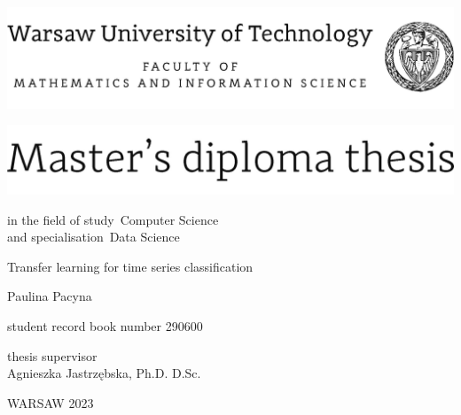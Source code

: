\documentclass[12pt,twoside,a4paper]{article}
\newcommand{\discipline}{Computer Science}
\renewcommand{\title}{Transfer learning for time series classification}
\newcommand{\supervisor}{Agnieszka Jastrzębska, Ph.D. D.Sc.}
\newcommand{\spec}{Data Science}
\renewcommand{\year}{2023}
\newcommand{\authori}{Paulina Pacyna}
\newcommand{\albumi}{290600}
\begin{document}
\pagestyle{empty}


\begin{center}
\includegraphics[scale=1.]{img/wut}
\vspace{40pt}


\includegraphics[scale=1.]{img/master} %

{ \arial
in the field of study~\discipline
\\
and specialisation~\spec

\vspace{30pt}
{\arial \large \title}


\vspace{40pt}

{\arial \huge \authori }

\vspace{5pt}

student record book number \albumi


\vspace{40pt}

thesis supervisor \\
{\arial \supervisor}


\vfill

WARSAW \year \\
}
\end{center}


%
%
\end{document}
